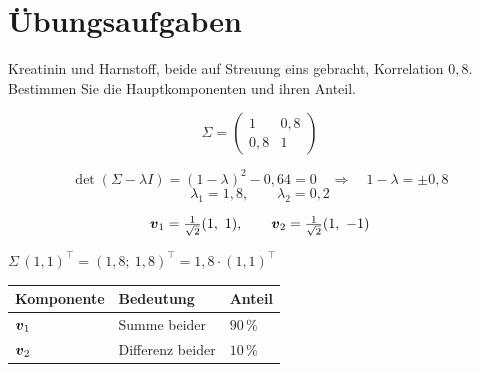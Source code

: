 \section{Übungsaufgaben}

\begin{aufgabe}
Kreatinin und Harnstoff, beide auf Streuung eins gebracht, Korrelation $0{,}8$. Bestimmen Sie die Hauptkomponenten und ihren Anteil.

\loesung
{}
\[ \Sigma = \begin{pmatrix} 1 & 0{,}8\\ 0{,}8 & 1\end{pmatrix} \]

\[ \det(\Sigma - \lambda I) = (1-\lambda)^{2} - 0{,}64 = 0 \quad\Longrightarrow\quad 1-\lambda = \pm0{,}8 \]
\[ \lambda_1 = 1{,}8, \qquad \lambda_2 = 0{,}2 \]

\[ \boldsymbol{v}_1 = \tfrac{1}{\sqrt2}(1,\ 1), \qquad \boldsymbol{v}_2 = \tfrac{1}{\sqrt2}(1,\ -1) \]

 $\Sigma\,(1,1)^{\!\top} = (1{,}8;\ 1{,}8)^{\!\top} = 1{,}8\cdot(1,1)^{\!\top}$ \checkmark

\begin{center}
{\small
\renewcommand{\arraystretch}{1.5}
\begin{tabular}{@{}P{2.4cm}P{2.6cm}P{1.6cm}@{}}
\toprule
\textbf{Komponente} & \textbf{Bedeutung} & \textbf{Anteil}\\
\midrule
$\boldsymbol{v}_1$ & Summe beider & $90\,\%$\\
$\boldsymbol{v}_2$ & Differenz beider & $10\,\%$\\
\bottomrule
\end{tabular}}
\end{center}

\begin{center}
\begin{minipage}{0.88\textwidth}
\end{minipage}
\end{center}
\end{aufgabe}

